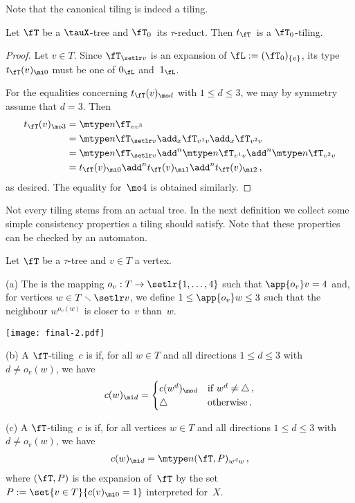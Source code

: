 \documentclass{LMCS}
\begin{document}
Note that the canonical tiling is indeed a tiling.
\begin{lem}\label{lem:tile is such}
Let $\fT$ be a $\tauX$-tree and $\fT_0$~its $\tau$-reduct.
Then $t_\fT$~is a $\fT_0$-tiling.
\end{lem}
\begin{proof}
Let $v \in T$.
Since $\fT_{\setlr v}$ is an expansion of $\fL := (\fT_0)_{\{v\}}$,
its type $t_\fT(v)_{\mi0}$ must be one of $0_\fL$ and~$1_\fL$.

For the equalities concerning $t_\fT(v)_{\mo d}$ with $1\leq d\leq 3$,
we may by symmetry assume that $d = 3$. Then
\begin{align*}
  t_\fT(v)_{\mo3}
  &= \mtype n{\fT_{vv^3}} \\
  &= \mtype n{
     \fT_{\setlr v}
     \add_x \fT_{v^1v}
     \add_x \fT_{v^2v}} \\
  &= \mtype n{\fT_{\setlr v}}
     \add^n \mtype n{\fT_{v^1v}}
     \add^n \mtype n{\fT_{v^2v}} \\
  &= t_\fT(v)_{\mi0}
     \add^n t_\fT(v)_{\mi1}
     \add^n t_\fT(v)_{\mi2}\,,
\end{align*}
as desired.
The equality for~$\mo4$ is obtained similarly.
\end{proof}

Not every tiling stems from an actual tree.
In the next definition we collect some simple consistency properties
a tiling should satisfy.
Note that these properties can be checked by an automaton.

\begin{defi}
Let $\fT$ be a $\tau$-tree and $v \in T$ a vertex.

\textup{(a)}
The 
is the mapping $o_v: T \to \setlr{1,\ldots,4}$
such that $\app{o_v}v=4$ and, for vertices $w\in T\smallsetminus\setlr v$,
we define $1\leq \app{o_v}w\leq 3$ such that the neighbour $w^{o_v(w)}$ is closer to~$v$ than~$w$.
\begin{center}
\texttt{[image: final-2.pdf]}
\end{center}

\textup{(b)}
A $\fT$-tiling~$c$ is 
if, for all $w\in T$ and all directions $1\leq d\leq 3$ with $d \neq o_v(w)$,
we have
\begin{align*}
  c(w)_{\mi d} = \begin{cases}
                   c(w^d)_{\mo d} &\text{if } w^d \neq \triangle\,, \\
                   \triangle      &\text{otherwise}\,.
                 \end{cases}
\end{align*}

\textup{(c)}
A $\fT$-tiling~$c$ is 
if, for all vertices $w\in T$ and all directions $1\leq d\leq 3$ with $d \neq o_v(w)$,
we have
\begin{align*}
  c(w)_{\mi d} = \mtype n{(\fT,P)_{w^dw}}\,,
\end{align*}
where $(\fT,P)$ is the expansion of~$\fT$
by the set $P := \set{v\in T}{c(v)_{\mi0}=1}$ interpreted for~$X$.
\end{defi}
\end{document}
